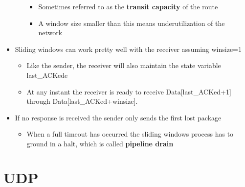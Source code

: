 \documentclass[11pt]{article}
\providecommand{\tightlist}{%
      \setlength{\itemsep}{0pt}\setlength{\parskip}{0pt}}
\begin{document}
\begin{itemize}
\begin{itemize}
    \begin{itemize}
    \tightlist
    \item
      Sometimes referred to as the \textbf{transit capacity} of the
      route
    \item
      A window size smaller than this means underutilization of the
      network
    \end{itemize}
  \end{itemize}
\item
  Sliding windows can work pretty well with the receiver assuming
  winsize=1

  \begin{itemize}
  \tightlist
  \item
    Like the sender, the receiver will also maintain the state variable
    last\_ACKede
  \item
    At any instant the receiver is ready to receive
    Data{[}last\_ACKed+1{]} through Data{[}last\_ACKed+winsize{]}.
  \end{itemize}
\item
  If no response is received the sender only sends the first lost
  package

  \begin{itemize}
  \tightlist
  \item
    When a full timeout has occurred the sliding windows process has to
    ground in a halt, which is called \textbf{pipeline drain}
  \end{itemize}
\end{itemize}

    \section{UDP}\label{udp}
\end{document}

